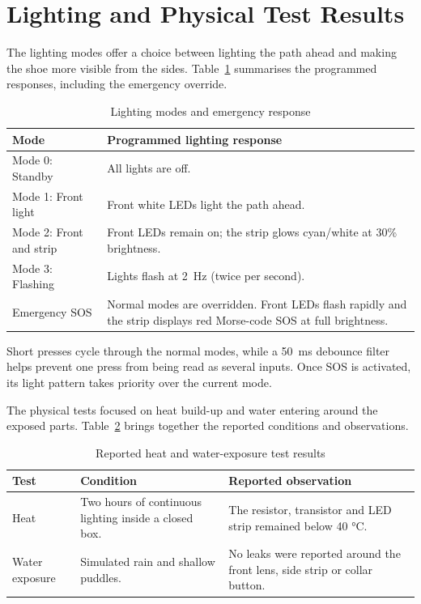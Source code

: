 \section{Lighting and Physical Test Results}
The lighting modes offer a choice between lighting the path ahead and making the shoe more visible from the sides. Table~\ref{tab:lighting_emergency} summarises the programmed responses, including the emergency override.

\begin{table}[H]
    \centering
    \caption{Lighting modes and emergency response}\label{tab:lighting_emergency}
    \begin{tabularx}{\textwidth}{
        >{\hsize=0.7\hsize\raggedright\arraybackslash}X
        >{\hsize=1.3\hsize\raggedright\arraybackslash}X
    }
    \toprule
    \textbf{Mode} & \textbf{Programmed lighting response} \\
    \midrule
    Mode 0: Standby & All lights are off. \\
    \addlinespace
    Mode 1: Front light & Front white LEDs light the path ahead. \\
    \addlinespace
    Mode 2: Front and strip & Front LEDs remain on; the strip glows cyan/white at 30\% brightness. \\
    \addlinespace
    Mode 3: Flashing & Lights flash at 2~Hz (twice per second). \\
    \addlinespace
    Emergency SOS & Normal modes are overridden. Front LEDs flash rapidly and the strip displays red Morse-code SOS at full brightness. \\
    \bottomrule
    \end{tabularx}
\end{table}

Short presses cycle through the normal modes, while a 50~ms debounce filter helps prevent one press from being read as several inputs. Once SOS is activated, its light pattern takes priority over the current mode.

The physical tests focused on heat build-up and water entering around the exposed parts. Table~\ref{tab:heat_water_exposure} brings together the reported conditions and observations.

\begin{table}[H]
    \centering
    \caption{Reported heat and water-exposure test results}\label{tab:heat_water_exposure}
    \begin{tabularx}{\textwidth}{
        >{\hsize=0.50\hsize\raggedright\arraybackslash}X
        >{\hsize=1.30\hsize\raggedright\arraybackslash}X
        >{\hsize=1.20\hsize\raggedright\arraybackslash}X
    }
    \toprule
    \textbf{Test} & \textbf{Condition} & \textbf{Reported observation} \\
    \midrule
    Heat & Two hours of continuous lighting inside a closed box. & The resistor, transistor and LED strip remained below 40 °C. \\
    \addlinespace
    Water exposure & Simulated rain and shallow puddles. & No leaks were reported around the front lens, side strip or collar button. \\
    \bottomrule
    \end{tabularx}
\end{table}

